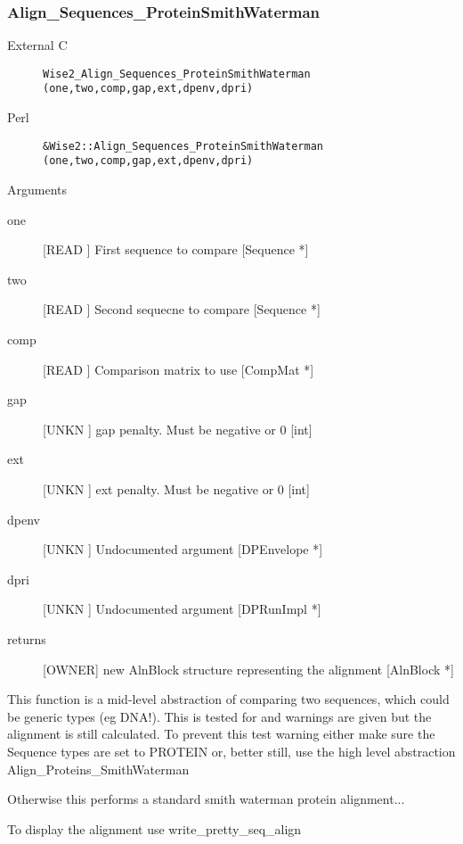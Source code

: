 \subsubsection{Align_Sequences_ProteinSmithWaterman}
\begin{description}
\item[External C] {\tt Wise2_Align_Sequences_ProteinSmithWaterman (one,two,comp,gap,ext,dpenv,dpri)}
\item[Perl] {\tt &Wise2::Align_Sequences_ProteinSmithWaterman (one,two,comp,gap,ext,dpenv,dpri)}

\end{description}
Arguments
\begin{description}
\item[one] [READ ] First sequence to compare [Sequence *]
\item[two] [READ ] Second sequecne to compare [Sequence *]
\item[comp] [READ ] Comparison matrix to use [CompMat *]
\item[gap] [UNKN ] gap penalty. Must be negative or 0 [int]
\item[ext] [UNKN ] ext penalty. Must be negative or 0 [int]
\item[dpenv] [UNKN ] Undocumented argument [DPEnvelope *]
\item[dpri] [UNKN ] Undocumented argument [DPRunImpl *]
\item[returns] [OWNER] new AlnBlock structure representing the alignment [AlnBlock *]
\end{description}
This function is a mid-level abstraction of
comparing two sequences, which could be
generic types (eg DNA!). This is tested
for and warnings are given but the alignment
is still calculated. To prevent this test
warning either make sure the Sequence types
are set to PROTEIN or, better still, use the
high level abstraction Align_Proteins_SmithWaterman


Otherwise this performs a standard smith waterman
protein alignment...


To display the alignment use  write_pretty_seq_align


